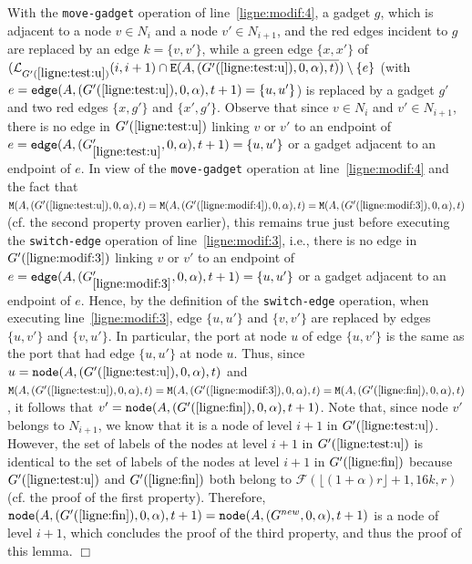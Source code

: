 \documentclass[11pt]{article}
\newcommand{\qed}{\hfill $\Box$ \bigbreak}
\newenvironment{proof}{\noindent {\bf Proof.}}{\qed}
\begin{document}
{\begin{proof}
With the {\tt move\mbox{-}gadget} operation of line~\ref{ligne:modif:4}, a gadget $g$, which is adjacent to a node $v\in N_i$ and a node $v'\in N_{i+1}$, and the red edges incident to $g$ are replaced by an edge $k=\{v,v'\}$, while a green edge $\{x,x'\}$ of $(\mathcal{L}_{G'(\ref{ligne:test:u})}(i,i+1)\cap\overline{{\tt E}(A,(G'(\ref{ligne:test:u}),0,\alpha),t)})\setminus \{e\}$ (with $e={\tt edge}(A,(G'(\ref{ligne:test:u}),0,\alpha),t+1)=\{u,u'\}$) is replaced by a gadget $g'$ and two red edges $\{x,g'\}$ and $\{x',g'\}$. Observe that since $v\in N_i$ and $v'\in N_{i+1}$, there is no edge in $G'(\ref{ligne:test:u})$ linking $v$ or $v'$ to an endpoint of $e={\tt edge}(A,(G'_{\ref{ligne:test:u}},0,\alpha),t+1)=\{u,u'\}$ or a gadget adjacent to an endpoint of $e$. In view of the {\tt move\mbox{-}gadget} operation at line~\ref{ligne:modif:4} and the fact that ${\tt M}(A,(G'({\ref{ligne:test:u}}),0,\alpha),t)={\tt M}(A,(G'({\ref{ligne:modif:4}}),0,\alpha),t)={\tt M}(A,(G'({\ref{ligne:modif:3}}),0,\alpha),t)$ (cf. the second property proven earlier), this remains true just before executing the {\tt switch\mbox{-}edge} operation of line~\ref{ligne:modif:3}, i.e., there is no edge in $G'(\ref{ligne:modif:3})$ linking $v$ or $v'$ to an endpoint of $e={\tt edge}(A,(G'_{\ref{ligne:modif:3}},0,\alpha),t+1)=\{u,u'\}$ or a gadget adjacent to an endpoint of $e$. Hence, by the definition of the {\tt switch\mbox{-}edge} operation, when executing line~\ref{ligne:modif:3}, edge $\{u,u'\}$ and $\{v,v'\}$ are replaced by edges $\{u,v'\}$ and $\{v,u'\}$. In particular, the port at node $u$ of edge $\{u,v'\}$ is the same as the port that had edge $\{u,u'\}$ at node $u$. Thus, since $u={\tt node}(A,(G'(\ref{ligne:test:u}),0,\alpha),t)$ and ${\tt M}(A,(G'({\ref{ligne:test:u}}),0,\alpha),t)={\tt M}(A,(G'({\ref{ligne:modif:3}}),0,\alpha),t)={\tt M}(A,(G'({\ref{ligne:fin}}),0,\alpha),t)$, it follows that $v'={\tt node}(A,(G'(\ref{ligne:fin}),0,\alpha),t+1)$. Note that, since node $v'$ belongs to $N_{i+1}$, we know that it is a node of level $i+1$ in $G'(\ref{ligne:test:u})$. However, the set of labels of the nodes at level $i+1$ in
  $G'(\ref{ligne:test:u})$ is identical to the set of labels of the nodes at level
  $i+1$ in $G'(\ref{ligne:fin})$ because $G'(\ref{ligne:test:u})$ and $G'(\ref{ligne:fin})$ both belong to $\mathcal{F}(\lfloor(1+\alpha)r\rfloor+1,16k,r)$ (cf. the proof of the first property). Therefore, ${\tt node}(A,(G'(\ref{ligne:fin}),0,\alpha),t+1)={\tt node}(A,(G^{new},0,\alpha),t+1)$ is a node of level $i+1$, which concludes the proof of the third property, and thus the proof of this lemma.
\end{proof}

}
\end{document}
